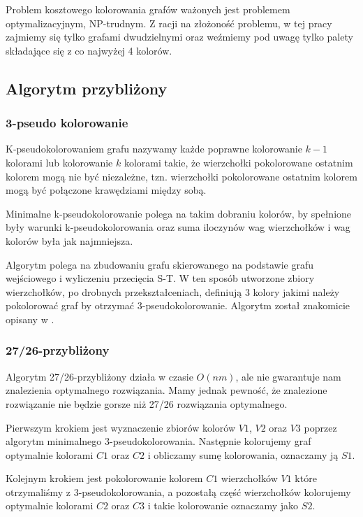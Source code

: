 \documentclass{article}
\begin{document}
Problem kosztowego kolorowania grafów ważonych jest problemem optymalizacyjnym, NP-trudnym. Z racji na złożoność problemu, w tej pracy zajmiemy się tylko grafami dwudzielnymi oraz weźmiemy pod uwagę tylko palety składające się z co najwyżej 4 kolorów.

\subsection{Algorytm przybliżony}

\subsubsection*{3-pseudo kolorowanie}

K-pseudokolorowaniem grafu nazywamy każde poprawne kolorowanie $k-1$ kolorami lub kolorowanie $k$ kolorami takie, że wierzchołki pokolorowane ostatnim kolorem mogą nie być niezależne, tzn. wierzchołki pokolorowane ostatnim kolorem mogą być połączone krawędziami między sobą. 

Minimalne k-pseudokolorowanie polega na takim dobraniu kolorów, by spełnione były warunki k-pseudokolorowania oraz suma iloczynów wag wierzchołków i wag kolorów była jak najmniejsza.

Algorytm polega na zbudowaniu grafu skierowanego na podstawie grafu wejściowego i wyliczeniu przecięcia S-T. W ten sposób utworzone zbiory wierzchołków, po drobnych przekształceniach, definiują 3 kolory jakimi należy pokolorować graf by otrzymać 3-pseudokolorowanie. Algorytm został znakomicie opisany w \cite{kubale-pikies19}.


\subsubsection*{27/26-przybliżony}

Algorytm 27/26-przybliżony działa w czasie $O(nm)$, ale nie gwarantuje nam znalezienia optymalnego rozwiązania. Mamy jednak pewność, że znalezione rozwiązanie nie będzie gorsze niż 27/26 rozwiązania optymalnego. 

Pierwszym krokiem jest wyznaczenie zbiorów kolorów $V1$, $V2$ oraz $V3$ poprzez algorytm minimalnego 3-pseudokolorowania. Następnie kolorujemy graf optymalnie kolorami $C1$ oraz $C2$ i obliczamy sumę kolorowania, oznaczamy ją $S1$. 

Kolejnym krokiem jest pokolorowanie kolorem $C1$ wierzchołków $V1$ które otrzymaliśmy z 3-pseudokolorowania, a pozostałą część wierzchołków kolorujemy optymalnie kolorami $C2$ oraz $C3$ i takie kolorowanie oznaczamy jako $S2$.
\end{document}
